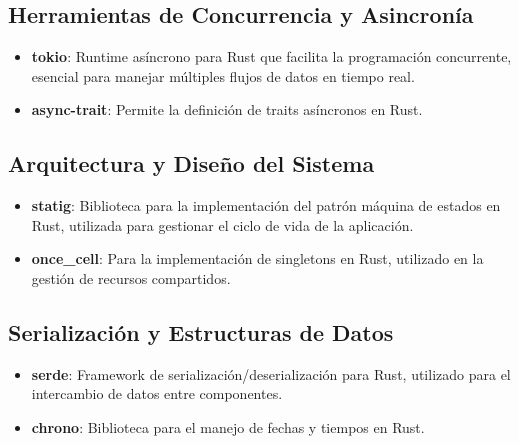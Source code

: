 \subsection{Herramientas de Concurrencia y Asincronía}
\begin{itemize}
    \item \textbf{tokio}: Runtime asíncrono para Rust que facilita la programación concurrente, esencial para manejar múltiples flujos de datos en tiempo real.
    \item \textbf{async-trait}: Permite la definición de traits asíncronos en Rust.
\end{itemize}

\subsection{Arquitectura y Diseño del Sistema}
\begin{itemize}
    \item \textbf{statig}: Biblioteca para la implementación del patrón máquina de estados en Rust, utilizada para gestionar el ciclo de vida de la aplicación.
    \item \textbf{once\_cell}: Para la implementación de singletons en Rust, utilizado en la gestión de recursos compartidos.
\end{itemize}

\subsection{Serialización y Estructuras de Datos}
\begin{itemize}
    \item \textbf{serde}: Framework de serialización/deserialización para Rust, utilizado para el intercambio de datos entre componentes.
    \item \textbf{chrono}: Biblioteca para el manejo de fechas y tiempos en Rust.
\end{itemize}
